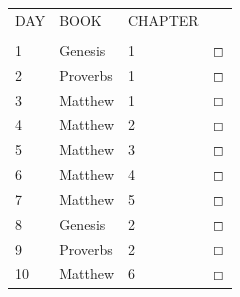 \documentclass[11pt,landscape,twocolumn,letterpaper]{article}
\begin{document}
\begin{tabular}{p{0.5in}p{1.6in}p{1.3in}p{0.35in}}
  DAY & BOOK & CHAPTER &  \\ \\

\textcolor[rgb]{0.00,0.00,1.00}{1} & \textcolor[rgb]{0.00,0.00,1.00}{\textcolor[rgb]{0.98,0.00,0.00}{Genesis}} & \textcolor[rgb]{0.98,0.00,0.00}{1} & \textcolor[rgb]{0.00,0.00,1.00}{$\boxempty$}\\

\textcolor[rgb]{0.00,0.00,1.00}{2} & \textcolor[rgb]{0.00,0.00,1.00}{\textcolor[rgb]{0.98,0.00,0.00}{Proverbs}} & \textcolor[rgb]{0.98,0.00,0.00}{1} & \textcolor[rgb]{0.00,0.00,1.00}{$\boxempty$}\\

\textcolor[rgb]{0.00,0.00,1.00}{3} & \textcolor[rgb]{0.00,0.00,1.00}{Matthew} & 1 & \textcolor[rgb]{0.00,0.00,1.00}{$\boxempty$}\\

\textcolor[rgb]{0.00,0.00,1.00}{4} & \textcolor[rgb]{0.00,0.00,1.00}{Matthew} & 2 & \textcolor[rgb]{0.00,0.00,1.00}{$\boxempty$}\\

\textcolor[rgb]{0.00,0.00,1.00}{5} & \textcolor[rgb]{0.00,0.00,1.00}{Matthew} & 3 & \textcolor[rgb]{0.00,0.00,1.00}{$\boxempty$}\\

\textcolor[rgb]{0.00,0.00,1.00}{6} & \textcolor[rgb]{0.00,0.00,1.00}{Matthew} & 4 & \textcolor[rgb]{0.00,0.00,1.00}{$\boxempty$}\\

\textcolor[rgb]{0.00,0.00,1.00}{7} & \textcolor[rgb]{0.00,0.00,1.00}{Matthew} & 5 & \textcolor[rgb]{0.00,0.00,1.00}{$\boxempty$}\\

  \textcolor[rgb]{0.00,0.00,1.00}{8} & \textcolor[rgb]{0.00,0.00,1.00}{\textcolor[rgb]{0.98,0.00,0.00}{Genesis}} & \textcolor[rgb]{0.98,0.00,0.00}{2} & \textcolor[rgb]{0.00,0.00,1.00}{$\boxempty$}\\

  \textcolor[rgb]{0.00,0.00,1.00}{9} & \textcolor[rgb]{0.00,0.00,1.00}{\textcolor[rgb]{0.98,0.00,0.00}{Proverbs}} & \textcolor[rgb]{0.98,0.00,0.00}{2} & \textcolor[rgb]{0.00,0.00,1.00}{$\boxempty$}\\

  \textcolor[rgb]{0.00,0.00,1.00}{10} & \textcolor[rgb]{0.00,0.00,1.00}{Matthew} & 6 & \textcolor[rgb]{0.00,0.00,1.00}{$\boxempty$}\\


\end{tabular}
\end{document}
